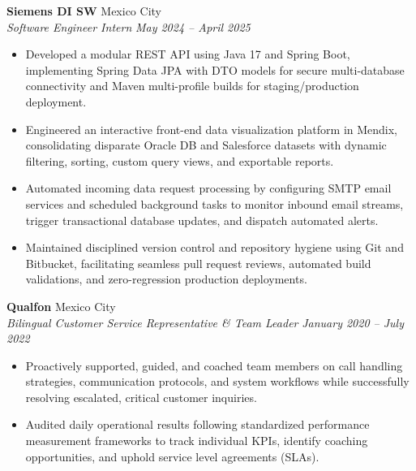 \documentclass[10pt, letterpaper]{article}
\newcommand{\jobentry}[4]{%
    \textbf{#1} \hfill #3 \\
    \textit{#2} \hfill \textit{#4}
    \vspace{2pt}
}
\begin{document}
\jobentry{Siemens DI SW}{Software Engineer Intern}{Mexico City}{May 2024 -- April 2025}
\begin{itemize}
    \item Developed a modular REST API using Java 17 and Spring Boot, implementing Spring Data JPA with DTO models for secure multi-database connectivity and Maven multi-profile builds for staging/production deployment.
    \item Engineered an interactive front-end data visualization platform in Mendix, consolidating disparate Oracle DB and Salesforce datasets with dynamic filtering, sorting, custom query views, and exportable reports.
    \item Automated incoming data request processing by configuring SMTP email services and scheduled background tasks to monitor inbound email streams, trigger transactional database updates, and dispatch automated alerts.
    \item Maintained disciplined version control and repository hygiene using Git and Bitbucket, facilitating seamless pull request reviews, automated build validations, and zero-regression production deployments.
\end{itemize}

\vspace{2pt}

\jobentry{Qualfon}{Bilingual Customer Service Representative \& Team Leader}{Mexico City}{January 2020 -- July 2022}
\begin{itemize}
    \item Proactively supported, guided, and coached team members on call handling strategies, communication protocols, and system workflows while successfully resolving escalated, critical customer inquiries.
    \item Audited daily operational results following standardized performance measurement frameworks to track individual KPIs, identify coaching opportunities, and uphold service level agreements (SLAs).
\end{itemize}
\end{document}
